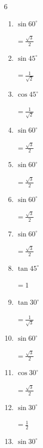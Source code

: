 \begin{multicols}{6}
\begin{enumerate}
        $\displaystyle =\frac{1}{2}$

  \item $\displaystyle \sin{60^\circ}$

        $\displaystyle =\frac{\sqrt{3}}{2}$

  \item $\displaystyle \sin{45^\circ}$

        $\displaystyle =\frac{1}{\sqrt{2}}$

  \item $\displaystyle \cos{45^\circ}$

        $\displaystyle =\frac{1}{\sqrt{2}}$

  \item $\displaystyle \sin{60^\circ}$

        $\displaystyle =\frac{\sqrt{3}}{2}$

  \item $\displaystyle \sin{60^\circ}$

        $\displaystyle =\frac{\sqrt{3}}{2}$

  \item $\displaystyle \sin{60^\circ}$

        $\displaystyle =\frac{\sqrt{3}}{2}$

  \item $\displaystyle \sin{60^\circ}$

        $\displaystyle =\frac{\sqrt{3}}{2}$

  \item $\displaystyle \tan{45^\circ}$

        $\displaystyle =1$

  \item $\displaystyle \tan{30^\circ}$

        $\displaystyle =\frac{1}{\sqrt{3}}$

  \item $\displaystyle \sin{60^\circ}$

        $\displaystyle =\frac{\sqrt{3}}{2}$

  \item $\displaystyle \cos{30^\circ}$

        $\displaystyle =\frac{\sqrt{3}}{2}$

  \item $\displaystyle \sin{30^\circ}$

        $\displaystyle =\frac{1}{2}$

\columnbreak %

  \item $\displaystyle \sin{30^\circ}$


\end{enumerate}
\end{multicols}
